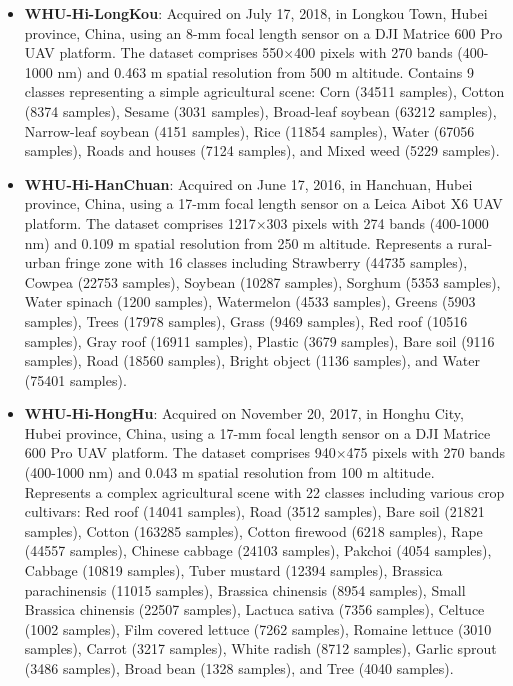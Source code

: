 \documentclass[journal]{IEEEtran}
\begin{document}
\begin{itemize}
\item \textbf{WHU-Hi-LongKou}: Acquired on July 17, 2018, in Longkou Town, Hubei province, China, using an 8-mm focal length sensor on a DJI Matrice 600 Pro UAV platform. The dataset comprises 550$\times$400 pixels with 270 bands (400-1000 nm) and 0.463 m spatial resolution from 500 m altitude. Contains 9 classes representing a simple agricultural scene: Corn (34511 samples), Cotton (8374 samples), Sesame (3031 samples), Broad-leaf soybean (63212 samples), Narrow-leaf soybean (4151 samples), Rice (11854 samples), Water (67056 samples), Roads and houses (7124 samples), and Mixed weed (5229 samples).

\item \textbf{WHU-Hi-HanChuan}: Acquired on June 17, 2016, in Hanchuan, Hubei province, China, using a 17-mm focal length sensor on a Leica Aibot X6 UAV platform. The dataset comprises 1217$\times$303 pixels with 274 bands (400-1000 nm) and 0.109 m spatial resolution from 250 m altitude. Represents a rural-urban fringe zone with 16 classes including Strawberry (44735 samples), Cowpea (22753 samples), Soybean (10287 samples), Sorghum (5353 samples), Water spinach (1200 samples), Watermelon (4533 samples), Greens (5903 samples), Trees (17978 samples), Grass (9469 samples), Red roof (10516 samples), Gray roof (16911 samples), Plastic (3679 samples), Bare soil (9116 samples), Road (18560 samples), Bright object (1136 samples), and Water (75401 samples).

\item \textbf{WHU-Hi-HongHu}: Acquired on November 20, 2017, in Honghu City, Hubei province, China, using a 17-mm focal length sensor on a DJI Matrice 600 Pro UAV platform. The dataset comprises 940$\times$475 pixels with 270 bands (400-1000 nm) and 0.043 m spatial resolution from 100 m altitude. Represents a complex agricultural scene with 22 classes including various crop cultivars: Red roof (14041 samples), Road (3512 samples), Bare soil (21821 samples), Cotton (163285 samples), Cotton firewood (6218 samples), Rape (44557 samples), Chinese cabbage (24103 samples), Pakchoi (4054 samples), Cabbage (10819 samples), Tuber mustard (12394 samples), Brassica parachinensis (11015 samples), Brassica chinensis (8954 samples), Small Brassica chinensis (22507 samples), Lactuca sativa (7356 samples), Celtuce (1002 samples), Film covered lettuce (7262 samples), Romaine lettuce (3010 samples), Carrot (3217 samples), White radish (8712 samples), Garlic sprout (3486 samples), Broad bean (1328 samples), and Tree (4040 samples).
\end{itemize}
\end{document}
